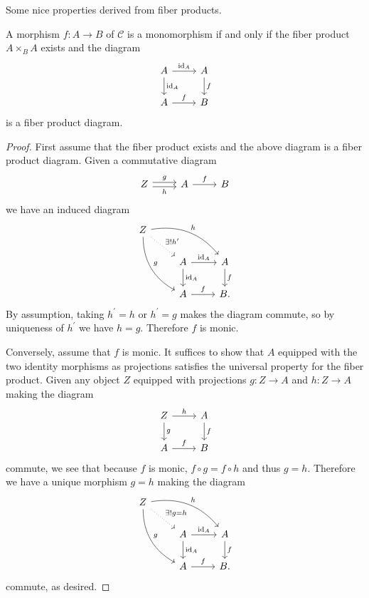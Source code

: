\documentclass[10pt]{amsart}
\begin{document}
Some nice properties derived from fiber products.

\begin{prop}\label{p.5}
  A morphism $f : A \rightarrow B$ of $\mathscr{C}$ is a monomorphism if and only if the fiber product $A \times_B A$ exists and the diagram
  $$\begin{tikzcd}
    A \arrow{d}{\operatorname{id}_A}\arrow{r}{\operatorname{id}_A} & A\arrow{d}{f}\\
    A\arrow{r}{f} & B
  \end{tikzcd}$$
  is a fiber product diagram.

  \begin{proof}
    First assume that the fiber product exists and the above diagram is a fiber product diagram.
    Given a commutative diagram
    $$\begin{tikzcd}
      Z \arrow[yshift=0.5ex]{r}{g} \arrow[yshift=-0.5ex,swap]{r}{h}& A \arrow{r}{f}& B
    \end{tikzcd}$$
    we have an induced diagram
    $$\begin{tikzcd}
      Z \arrow[bend right]{ddr}{g} \arrow[bend left]{rrd}{h} \arrow[dotted]{rd}{\exists !h^\prime}\\
      & A\arrow{d}{\operatorname{id}_A}\arrow{r}{\operatorname{id}_A} & A\arrow{d}{f}\\
      & A\arrow{r}{f} & B.
    \end{tikzcd}$$
    By assumption, taking $h^\prime = h$ or $h^\prime = g$ makes the diagram commute, so by uniqueness of $h^\prime$ we have $h = g$.
    Therefore $f$ is monic.

    Conversely, assume that $f$ is monic.
    It suffices to show that $A$ equipped with the two identity morphisms as projections satisfies the universal property for the fiber product.
    Given any object $Z$ equipped with projections $g : Z \rightarrow A$ and $h : Z \rightarrow A$ making the diagram
    $$\begin{tikzcd}
      Z \arrow{d}{g} \arrow{r}{h} & A\arrow{d}{f}\\
      A\arrow{r}{f} & B
    \end{tikzcd}$$
    commute, we see that because $f$ is monic,
    $f \circ g = f \circ h$
    and thus $g = h$.
    Therefore we have a unique morphism $g = h$ making the diagram
    $$\begin{tikzcd}
      Z \arrow[bend right]{ddr}{g} \arrow[bend left]{rrd}{h} \arrow[dotted]{rd}{\exists !g = h}\\
      & A\arrow{d}{\operatorname{id}_A}\arrow{r}{\operatorname{id}_A} & A\arrow{d}{f}\\
      & A\arrow{r}{f} & B.
    \end{tikzcd}$$
    commute, as desired.
  \end{proof}
\end{prop}
\end{document}
